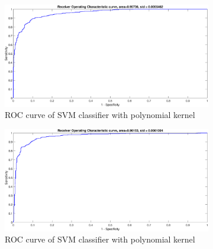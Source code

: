 \documentclass[12pt]{report}
\begin{document}
{\begin{figure}[!ht] 
	\centering
	\begin{subfigure}{.35\textwidth}
		\centering
		\captionsetup{width=0.8\linewidth}
		\includegraphics[height=.65\linewidth, width=0.9\linewidth]{ripley/ripley_lin_ROC.eps}
		\caption{ROC curve of SVM classifier with polynomial kernel}
		\label{fig:ripley_lin_ROC}
	\end{subfigure}%
	\begin{subfigure}{.35\textwidth}
		\centering
		\captionsetup{width=0.8\linewidth}
		\includegraphics[height=.65\linewidth, width=0.9\linewidth]{ripley/ripley_poly_ROC.eps}
		\caption{ROC curve of SVM classifier with polynomial kernel}
		\label{fig:ripley_poly_ROC}
	\end{subfigure}%
	\begin{subfigure}{.35\textwidth}
		\centering
		\captionsetup{width=0.8\linewidth}

\end{subfigure}
\end{figure}}
\end{document}
